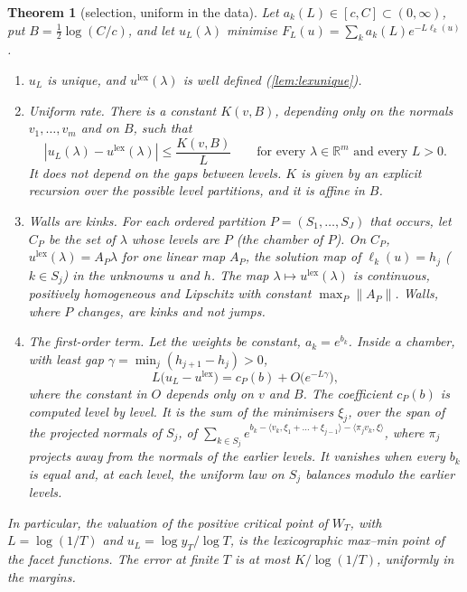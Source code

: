 \documentclass[11pt]{article}
\newtheorem{theorem}{Theorem}\newtheorem{proposition}[theorem]{Proposition}\newtheorem{lemma}[theorem]{Lemma}\newtheorem{corollary}[theorem]{Corollary}\newtheorem{conjecture}[theorem]{Conjecture}\crefname{conjecture}{Conjecture}{Conjectures}
\theoremstyle{definition}\newtheorem{definition}[theorem]{Definition}\newtheorem{remark}[theorem]{Remark}\newtheorem{example}[theorem]{Example}\newtheorem{problem}[theorem]{Open problem}\crefname{problem}{Problem}{Problems}
\newcommand{\R}{\mathbb R}
\begin{document}
\begin{theorem}[selection, uniform in the data]\label{thm:selection}
Let $a_k(L)\in[c,C]\subset(0,\infty)$, put $B=\tfrac12\log(C/c)$, and let $u_L(\lambda)$ minimise $F_L(u)=\sum_ka_k(L)e^{-L\ell_k(u)}$.
\begin{enumerate}
\item[(a)] $u_L$ is unique, and $u^{\mathrm{lex}}(\lambda)$ is well defined (\cref{lem:lexunique}).
\item[(b)] \emph{Uniform rate.} There is a constant $K(v,B)$, depending only on the normals $v_1,\dots,v_m$ and on $B$, such that
\[
|u_L(\lambda)-u^{\mathrm{lex}}(\lambda)|\le\frac{K(v,B)}{L}\qquad\text{for every }\lambda\in\R^m\text{ and every }L>0.
\]
It does not depend on the gaps between levels. $K$ is given by an explicit recursion over the possible level partitions, and it is affine in $B$.
\item[(c)] \emph{Walls are kinks.} For each ordered partition $P=(S_1,\dots,S_J)$ that occurs, let $C_P$ be the set of $\lambda$ whose levels are $P$ (the \emph{chamber} of $P$). On $C_P$, $u^{\mathrm{lex}}(\lambda)=A_P\lambda$ for one linear map $A_P$, the solution map of $\ell_k(u)=h_j$ ($k\in S_j$) in the unknowns $u$ and $h$. The map $\lambda\mapsto u^{\mathrm{lex}}(\lambda)$ is continuous, positively homogeneous and Lipschitz with constant $\max_P\|A_P\|$. Walls, where $P$ changes, are kinks and not jumps.
\item[(d)] \emph{The first-order term.} Let the weights be constant, $a_k=e^{b_k}$. Inside a chamber, with least gap $\gamma=\min_j(h_{j+1}-h_j)>0$,
\[
L\bigl(u_L-u^{\mathrm{lex}}\bigr)=c_P(b)+O\bigl(e^{-L\gamma}\bigr),
\]
where the constant in $O$ depends only on $v$ and $B$. The coefficient $c_P(b)$ is computed level by level. It is the sum of the minimisers $\xi_j$, over the span of the projected normals of $S_j$, of $\sum_{k\in S_j}e^{b_k-\langle v_k,\xi_1+\dots+\xi_{j-1}\rangle-\langle\pi_jv_k,\xi\rangle}$, where $\pi_j$ projects away from the normals of the earlier levels. It vanishes when every $b_k$ is equal and, at each level, the uniform law on $S_j$ balances modulo the earlier levels.
\end{enumerate}
In particular, the valuation of the positive critical point of $W_T$, with $L=\log(1/T)$ and $u_L=\log y_T/\log T$, is the lexicographic max--min point of the facet functions. The error at finite $T$ is at most $K/\log(1/T)$, uniformly in the margins.
\end{theorem}
\end{document}
